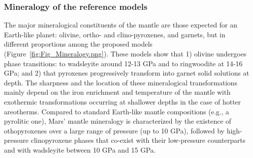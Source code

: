 \subsubsection{Mineralogy of the reference models}
The major mineralogical constituents of the mantle are those expected for an Earth-like planet: olivine, ortho- and clino-pyroxenes, and garnets, but in different proportions among the proposed models \citep{Dreibus&Wanke1985,Sanloup1999,Taylor2013,Bertka1997} (Figure~\ref{fig:Fig_Mineralogy.png}). These models show that 1) olivine undergoes phase transitions: to wadsleyite around 12-13 GPa and to ringwoodite at 14-16 GPa; and 2) that pyroxenes progressively transform into garnet solid solutions at depth. The sharpness and the location of these mineralogical transformations mainly depend on the iron enrichment and temperature of the mantle with exothermic transformations occurring at shallower depths in the case of hotter areotherms. Compared to standard Earth-like mantle compositions (e.g., a pyrolitic one), Mars' mantle mineralogy is characterized by the existence of othopyroxenes over a large range of pressure (up to 10 GPa), followed by high-pressure clinopyroxene phases that co-exist with their low-pressure counterparts and with wadsleyite between 10 GPa and 15 GPa.

